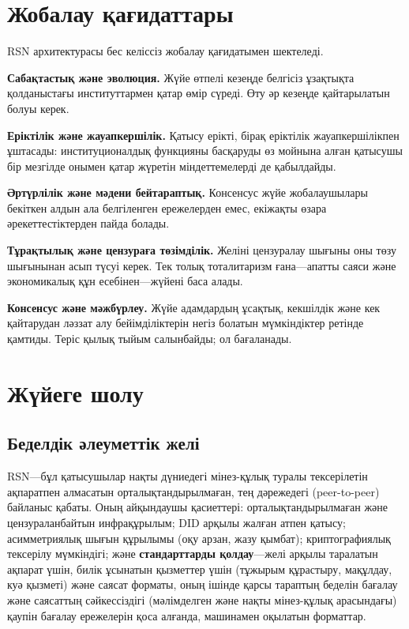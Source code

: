 \documentclass[11pt,a4paper,twocolumn]{article}
\begin{document}
\section{Жобалау қағидаттары}

RSN архитектурасы бес келіссіз жобалау қағидатымен шектеледі.

\textbf{Сабақтастық және эволюция.} Жүйе өтпелі кезеңде белгісіз ұзақтықта қолданыстағы институттармен қатар өмір сүреді. Өту әр кезеңде қайтарылатын болуы керек.

\textbf{Еріктілік және жауапкершілік.} Қатысу ерікті, бірақ еріктілік жауапкершілікпен ұштасады: институционалдық функцияны басқаруды өз мойнына алған қатысушы бір мезгілде онымен қатар жүретін міндеттемелерді де қабылдайды.

\textbf{Әртүрлілік және мәдени бейтараптық.} Консенсус жүйе жобалаушылары бекіткен алдын ала белгіленген ережелерден емес, екіжақты өзара әрекеттестіктерден пайда болады.

\textbf{Тұрақтылық және цензураға төзімділік.} Желіні цензуралау шығыны оны төзу шығынынан асып түсуі керек. Тек толық тоталитаризм ғана---апатты саяси және экономикалық құн есебінен---жүйені баса алады.

\textbf{Консенсус және мәжбүрлеу.} Жүйе адамдардың ұсақтық, кекшілдік және кек қайтарудан ләззат алу бейімділіктерін негіз болатын мүмкіндіктер ретінде қамтиды. Теріс қылық тыйым салынбайды; ол бағаланады.

\section{Жүйеге шолу}

\subsection{Беделдік әлеуметтік желі}

RSN---бұл қатысушылар нақты дүниедегі мінез-құлық туралы тексерілетін ақпаратпен алмасатын орталықтандырылмаған, тең дәрежедегі (peer-to-peer) байланыс қабаты. Оның айқындаушы қасиеттері: орталықтандырылмаған және цензураланбайтын инфрақұрылым; DID арқылы жалған атпен қатысу; асимметриялық шығын құрылымы (оқу арзан, жазу қымбат); криптографиялық тексерілу мүмкіндігі; және \textbf{стандарттарды қолдау}---желі арқылы таралатын ақпарат үшін, билік ұсынатын қызметтер үшін (тұжырым құрастыру, мақұлдау, куә қызметі) және саясат форматы, оның ішінде қарсы тараптың беделін бағалау және саясаттың сәйкессіздігі (мәлімделген және нақты мінез-құлық арасындағы) қаупін бағалау ережелерін қоса алғанда, машинамен оқылатын форматтар.
\end{document}
